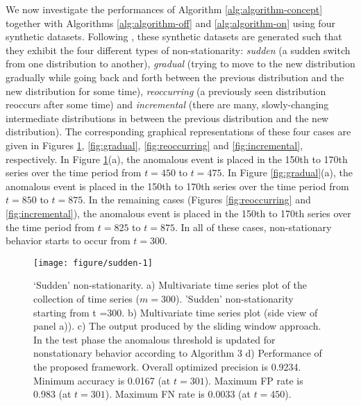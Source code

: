 \documentclass[12pt]{article}
\begin{document}
\label{sec:experiment_concept}

We now investigate the performances of Algorithm
\ref{alg:algorithm-concept} together with Algorithms
\ref{alg:algorithm-off} and \ref{alg:algorithm-on} using four synthetic
datasets. Following \citet{gama2014survey}, these synthetic datasets are
generated such that they exhibit the four different types of
non-stationarity: \emph{sudden} (a sudden switch from one distribution
to another), \emph{gradual} (trying to move to the new distribution
gradually while going back and forth between the previous distribution
and the new distribution for some time), \emph{reoccurring} (a
previously seen distribution reoccurs after some time) and
\emph{incremental} (there are many, slowly-changing intermediate
distributions in between the previous distribution and the new
distribution). The corresponding graphical representations of these four
cases are given in Figures \ref{fig:sudden}, \ref{fig:gradual},
\ref{fig:reoccurring} and \ref{fig:incremental}, respectively. In Figure
\ref{fig:sudden}(a), the anomalous event is placed in the 150th to 170th
series over the time period from \(t = 450\) to \(t= 475\). In Figure
\ref{fig:gradual}(a), the anomalous event is placed in the 150th to
170th series over the time period from \(t = 850\) to \(t= 875\). In the
remaining cases (Figures \ref{fig:reoccurring} and
\ref{fig:incremental}), the anomalous event is placed in the 150th to
170th series over the time period from \(t = 825\) to \(t= 875\). In all
of these cases, non-stationary behavior starts to occur from \(t=300\).

\begin{figure}[!bp]

{\centering \texttt{[image: figure/sudden-1]} 

}

\caption{`Sudden' non-stationarity.  a) Multivariate time series plot of the collection of time series ($m = 300$). 'Sudden' non-stationarity starting from t =300.  b) Multivariate time series plot (side view of panel a)). c) The output produced by the sliding window approach. In the test phase the anomalous threshold is updated for nonstationary behavior according to Algorithm 3  d) Performance of the proposed framework. Overall optimized precision is 0.9234.  Minimum accuracy is 0.0167 (at $t = 301$). Maximum FP rate is 0.983 (at $t=301$). Maximum FN rate is 0.0033 (at $t=450$).}\label{fig:sudden}
\end{figure}
\end{document}
